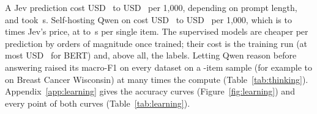 A Jev prediction cost USD~\CostPerKJevSst{} to USD~\CostPerKJevWdbc{} per 1,000, depending on
prompt length, and took \JevLatencySst\,s. Self-hosting Qwen on \texttt{\QwenScoringInstance}
cost USD~\CostPerKQwenSst{} to USD~\CostPerKQwenWdbc{} per 1,000, which is \CostRatioQwenJevSst{}
to \CostRatioQwenJevWdbc{} times Jev's price, at \QwenLatencySst{} to \QwenLatencyWdbc\,s per
single item. The supervised models are cheaper per prediction by orders of magnitude once
trained; their cost is the training run (at most USD~\TrainUSDBertAgnews{} for BERT) and, above
all, the labels. Letting Qwen reason before answering raised its macro-F1 on every dataset on a
\ThinkSubsampleN-item sample (for example \ThinkSubFOneQwenWdbc{} to
\ThinkSubFOneQwenThinkWdbc{} on Breast Cancer Wisconsin) at many times the compute
(Table~\ref{tab:thinking}). Appendix~\ref{app:learning} gives the accuracy curves
(Figure~\ref{fig:learning}) and every point of both curves (Table~\ref{tab:learning}).
